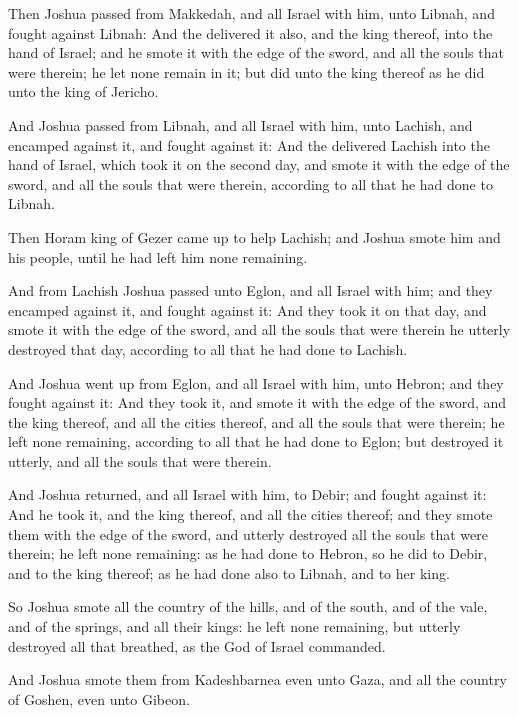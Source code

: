 \verse Then Joshua passed from Makkedah, and all Israel with him, unto Libnah, and fought against Libnah: \verse And the \LORD delivered it also, and the king thereof, into the hand of Israel; and he smote it with the edge of the sword, and all the souls that were therein; he let none remain in it; but did unto the king thereof as he did unto the king of Jericho.

\verse And Joshua passed from Libnah, and all Israel with him, unto Lachish, and encamped against it, and fought against it: \verse And the \LORD delivered Lachish into the hand of Israel, which took it on the second day, and smote it with the edge of the sword, and all the souls that were therein, according to all that he had done to Libnah.

\verse Then Horam king of Gezer came up to help Lachish; and Joshua smote him and his people, until he had left him none remaining.

\verse And from Lachish Joshua passed unto Eglon, and all Israel with him; and they encamped against it, and fought against it: \verse And they took it on that day, and smote it with the edge of the sword, and all the souls that were therein he utterly destroyed that day, according to all that he had done to Lachish.

\verse And Joshua went up from Eglon, and all Israel with him, unto Hebron; and they fought against it: \verse And they took it, and smote it with the edge of the sword, and the king thereof, and all the cities thereof, and all the souls that were therein; he left none remaining, according to all that he had done to Eglon; but destroyed it utterly, and all the souls that were therein.

\verse And Joshua returned, and all Israel with him, to Debir; and fought against it: \verse And he took it, and the king thereof, and all the cities thereof; and they smote them with the edge of the sword, and utterly destroyed all the souls that were therein; he left none remaining: as he had done to Hebron, so he did to Debir, and to the king thereof; as he had done also to Libnah, and to her king.

\verse So Joshua smote all the country of the hills, and of the south, and of the vale, and of the springs, and all their kings: he left none remaining, but utterly destroyed all that breathed, as the \LORD God of Israel commanded.

\verse And Joshua smote them from Kadeshbarnea even unto Gaza, and all the country of Goshen, even unto Gibeon.

